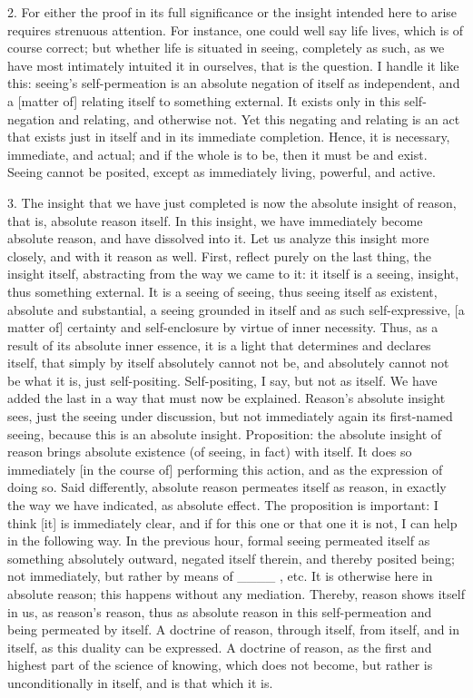 2. For either the proof in its full significance
or the insight intended here to arise
requires strenuous attention.
For instance, one could well say life lives,
which is of course correct;
but whether life is situated in seeing,
completely as such,
as we have most intimately intuited it in ourselves,
that is the question.
I handle it like this:
seeing's self-permeation is
an absolute negation of itself as independent,
and a [matter of] relating itself to something external.
It exists only in this self-negation and relating,
and otherwise not.
Yet this negating and relating is
an act that exists just in itself
and in its immediate completion.
Hence, it is necessary, immediate, and actual;
and if the whole is to be,
then it must be and exist.
Seeing cannot be posited,
except as immediately living, powerful, and active.

3. The insight that we have just completed is
now the absolute insight of reason,
that is, absolute reason itself.
In this insight, we have
immediately become absolute reason,
and have dissolved into it.
Let us analyze this insight more closely,
and with it reason as well.
First, reflect purely on the last thing,
the insight itself,
abstracting from the way we came to it:
it itself is a seeing, insight,
thus something external.
It is a seeing of seeing,
thus seeing itself as existent,
absolute and substantial,
a seeing grounded in itself
and as such self-expressive,
[a matter of] certainty and self-enclosure
by virtue of inner necessity.
Thus, as a result of its absolute inner essence,
it is a light that determines and declares itself,
that simply by itself absolutely cannot not be,
and absolutely cannot not be what it is,
just self-positing.
Self-positing, I say, but not as itself.
We have added the last in a way that must now be explained.
Reason's absolute insight sees,
just the seeing under discussion,
but not immediately again its first-named seeing,
because this is an absolute insight.
Proposition: the absolute insight of reason
brings absolute existence
(of seeing, in fact) with itself.
It does so immediately [in the course of]
performing this action,
and as the expression of doing so.
Said differently, absolute reason
permeates itself as reason,
in exactly the way we have indicated,
as absolute effect.
The proposition is important:
I think [it] is immediately clear,
and if for this one or that one it is not,
I can help in the following way.
In the previous hour,
formal seeing permeated itself
as something absolutely outward,
negated itself therein,
and thereby posited being;
not immediately, but rather by means of ____ , etc.
It is otherwise here in absolute reason;
this happens without any mediation.
Thereby, reason shows itself in us, as reason's reason,
thus as absolute reason in this self-permeation
and being permeated by itself.
A doctrine of reason,
through itself, from itself, and in itself,
as this duality can be expressed.
A doctrine of reason,
as the first and highest part
of the science of knowing,
which does not become,
but rather is unconditionally in itself,
and is that which it is.

